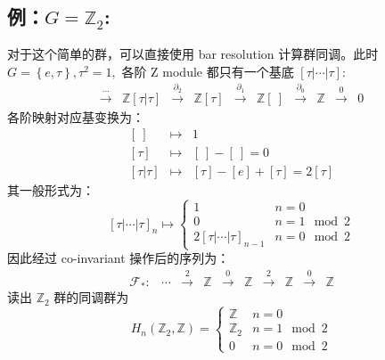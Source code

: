 \documentclass[UTF8]{ctexart}
\begin{document}
\subsection*{例：$G=\mathbb{Z}_{2}$:}
\noindent
对于这个简单的群，可以直接使用 bar resolution 计算群同调。此时 $G=\left\{ e,\tau\right\} ,\tau^{2}=1,$
各阶 Z module 都只有一个基底 $\left[\tau|\cdots|\tau\right]$:
\begin{equation}
\begin{array}{cccccccccc}
\stackrel{\cdots}{\longrightarrow} & {\displaystyle \mathbb{Z}\left[\left.\tau\right|\tau\right]} & \stackrel{\partial_{2}}{\longrightarrow} & {\displaystyle \mathbb{Z}\left[\tau\right]} & \stackrel{\partial_{1}}{\longrightarrow} & \mathbb{Z}\left[\ \right] & \stackrel{\partial_{0}}{\longrightarrow} & \mathbb{Z} & \stackrel{0}{\longrightarrow} & 0\end{array}
\end{equation}
各阶映射对应基变换为：
\begin{eqnarray}
\left[\ \right] & \mapsto & 1\\
\left[\tau\right] & \mapsto & \left[\ \right]-\left[\ \right]=0\\
\left[\left.\tau\right|\tau\right] & \mapsto & \left[\tau\right]-\left[e\right]+\left[\tau\right]=2\left[\tau\right]
\end{eqnarray}
其一般形式为：
\begin{equation}
\left[\tau|\cdots|\tau\right]_{n}\mapsto\begin{cases}
1 & n=0\\
0 & n=1\mod2\\
2\left[\tau|\cdots|\tau\right]_{n-1} & n=0\mod2
\end{cases}
\end{equation}
因此经过 co-invariant 操作后的序列为：
\begin{equation}
\begin{array}{cccccccccc}
\mathcal{F}_{*}: & \cdots & \stackrel{2}{\longrightarrow} & \mathbb{Z} & \stackrel{0}{\longrightarrow} & {\displaystyle \mathbb{Z}} & \stackrel{2}{\longrightarrow} & {\displaystyle \mathbb{Z}} & \stackrel{0}{\longrightarrow} & \mathbb{Z}\end{array}
\end{equation}
读出 $\mathbb{Z}_{2}$ 群的同调群为
\begin{equation}
H_{n}\left(\mathbb{Z}_{2},\mathbb{Z}\right)=\begin{cases}
\mathbb{Z} & n=0\\
\mathbb{Z}_{2} & n=1\mod2\\
0 & n=0\mod2
\end{cases}
\end{equation}
\end{document}
